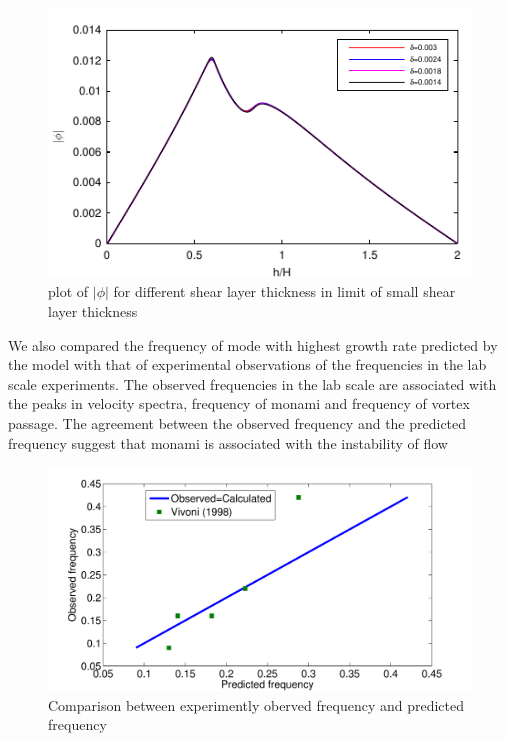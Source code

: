 \documentclass[aps,twocolumn,floatfix,prl,10pt]{revtex4-1}
\begin{document}
\begin{figure}[]
\includegraphics[]{Asymptotic_eig_set3}
\caption{plot of $|\phi|$ for different shear layer thickness in limit of small shear layer thickness}
\label{Asymptotic_mode}
\end{figure}
\newline
We also compared the frequency of mode with highest growth rate predicted by the model with that of experimental observations of the frequencies in the lab scale experiments.
The observed frequencies in the lab scale are associated with the peaks in velocity spectra, frequency of monami and frequency of vortex passage. The agreement between the observed
frequency and the predicted frequency suggest that monami is associated with the instability of flow 
\begin{figure}[htb]
\includegraphics[scale=0.34]{Observed_vs_calculated}
\caption{Comparison between experimently oberved frequency and predicted frequency}
\label{Observed_calculated}
\end{figure}
\end{document}
